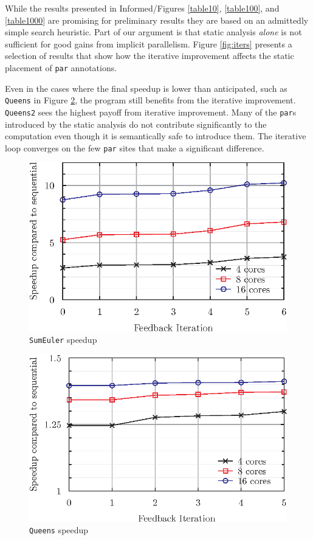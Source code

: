While the results presented in Informed/Figures \ref{table10}, \ref{table100}, and
\ref{table1000} are promising for preliminary results they are based on an
admittedly simple search heuristic. Part of our argument is that static analysis
\emph{alone} is not sufficient for good gains from implicit parallelism. Figure
\ref{fig:iters} presents a selection of results that show how the iterative
improvement affects the static placement of \verb-par- annotations.

Even in the cases where the final speedup is lower than anticipated, such as
\texttt{Queens} in Figure \ref{fig:iterQueens}, the program still benefits from the
iterative improvement. \texttt{Queens2} sees the highest payoff from iterative
improvement. Many of the \verb-par-s introduced by the static analysis
do not contribute significantly to the computation even though it is
semantically safe to introduce them. The iterative loop converges on the few
\verb-par- sites that make a significant difference.

\begin{figure}[h]
    \includegraphics[scale=0.75]{Informed/Figures/IterSum.eps}
    \caption[SE]{\texttt{SumEuler} speedup}
    \label{fig:iterSum}
\end{figure}
\begin{figure}[h]
    \includegraphics[scale=0.75]{Informed/Figures/IterQueens.eps}
    \caption[Q]{\texttt{Queens} speedup}
    \label{fig:iterQueens}
\end{figure}

